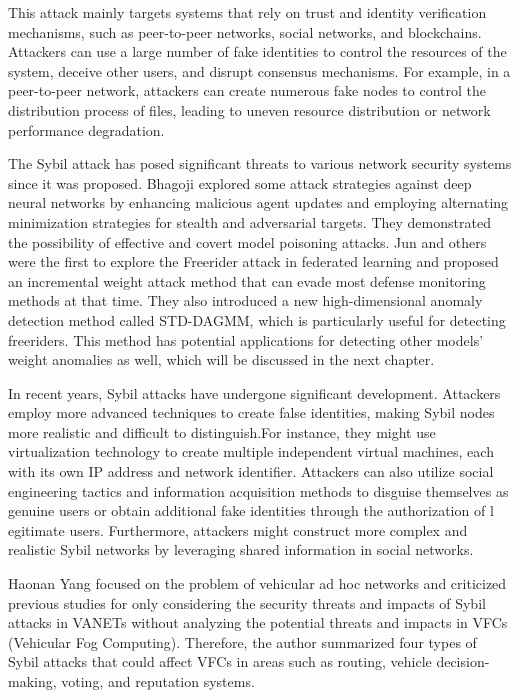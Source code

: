 \documentclass[conference]{IEEEtran}
\begin{document}
This attack mainly targets systems that rely on trust and identity verification mechanisms, 
such as peer-to-peer networks, social networks, and blockchains. Attackers can use a large number of fake identities to control the resources of the system, deceive other users,
and disrupt consensus mechanisms. For example, in a peer-to-peer network, attackers can create numerous fake nodes to control the distribution process of files,
leading to uneven resource distribution or network performance degradation.

The Sybil attack has posed significant threats to various network security systems since it was 
proposed. Bhagoji \cite{b111} explored some attack strategies against deep neural networks by enhancing 
malicious agent updates and employing alternating minimization strategies for stealth and adversarial 
targets. They demonstrated the possibility of effective and covert model poisoning attacks. 
Jun  \cite{b112} and others were the first to explore the Freerider attack in federated learning and proposed 
an incremental weight attack method that can evade most defense monitoring methods at that time. 
They also introduced a new high-dimensional anomaly detection method called STD-DAGMM, which is 
particularly useful for detecting freeriders. This method has potential applications for detecting 
other models' weight anomalies as well, which will be discussed in the next chapter.

In recent years, Sybil attacks have undergone significant development. 
Attackers employ more advanced techniques to create false identities, making Sybil nodes 
more realistic and difficult to distinguish.For instance, they might use virtualization technology
to create multiple independent virtual machines, each with its own IP address and network identifier.
Attackers can also utilize social engineering tactics and information acquisition methods to disguise 
themselves as genuine users or obtain additional fake identities through the authorization of l
egitimate users. Furthermore, attackers might construct more complex and realistic Sybil networks 
by leveraging shared information in social networks. 

Haonan Yang \cite{b113} focused on the problem of vehicular ad hoc networks and criticized previous 
studies for only considering the security threats and impacts of Sybil attacks in VANETs without 
analyzing the potential threats and impacts in VFCs (Vehicular Fog Computing). 
Therefore, the author summarized four types of Sybil attacks that could affect VFCs in areas such 
as routing, vehicle decision-making, voting, and reputation systems.
\end{document}
